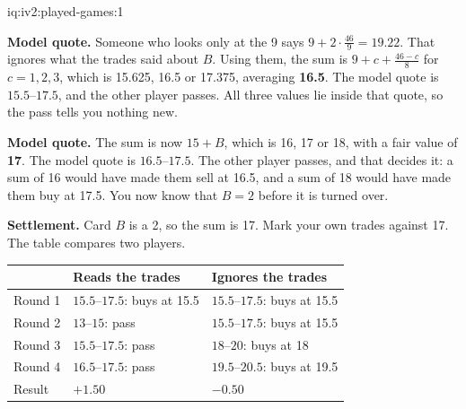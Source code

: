 \begin{solution}{iq:iv2:played-games:1}
\ivstop

\textbf{Model quote.} Someone who looks only at the 9 says $9 + 2 \cdot \frac{46}{9} = 19.22$. That ignores what the trades said about $B$. Using them, the sum is $9 + c + \frac{46 - c}{8}$ for $c = 1, 2, 3$, which is 15.625, 16.5 or 17.375, averaging \textbf{16.5}. The model quote is $15.5$--$17.5$, and the other player passes. All three values lie inside that quote, so the pass tells you nothing new.

\ivstop

\textbf{Model quote.} The sum is now $15 + B$, which is 16, 17 or 18, with a fair value of \textbf{17}. The model quote is $16.5$--$17.5$. The other player passes, and that decides it: a sum of 16 would have made them sell at 16.5, and a sum of 18 would have made them buy at 17.5. You now know that $B = 2$ before it is turned over.

\medskip
\textbf{Settlement.} Card $B$ is a 2, so the sum is 17. Mark your own trades against 17. The table compares two players.
\begin{center}\small
\begin{tabular}{@{}lll@{}}
 & Reads the trades & Ignores the trades \\ \hline
Round 1 & $15.5$--$17.5$: buys at 15.5 & $15.5$--$17.5$: buys at 15.5 \\
Round 2 & $13$--$15$: pass & $15.5$--$17.5$: buys at 15.5 \\
Round 3 & $15.5$--$17.5$: pass & $18$--$20$: buys at 18 \\
Round 4 & $16.5$--$17.5$: pass & $19.5$--$20.5$: buys at 19.5 \\ \hline
Result & $+1.50$ & $-0.50$
\end{tabular}
\end{center}


\end{solution}

